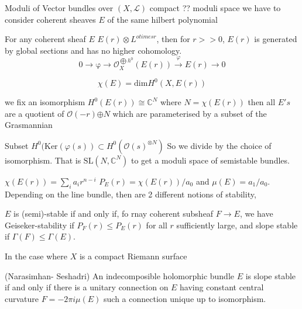 Moduli of Vector bundles over $ (X, \mathcal{L} ) $
compact ?? moduli space we have to consider coherent sheaves $E$ of the same hilbert polynomial 

For any coherent sheaf $E$  $E(r) \otimes L^{otimes r} $, 
then for $ r >> 0 $, $E(r) $ is generated by global sections and has no higher cohomology. 
\begin{equation}
    0 \rightarrow \mathrm{\varphi} \rightarrow \mathcal{O} _X ^{\bigoplus h^0} (E(r)) \xrightarrow{\varphi} E(r) \rightarrow 0 
\end{equation}

\begin{equation}
    \chi(E) = \mathrm{dim} H^0 (X, E(r)) 
\end{equation}

we fix an isomorphism $H^0 (E(r) ) \cong \mathbb{C} ^N $ where $ N = \chi(E(r))$
then all $ E's $ are a quotient of $ \mathcal{O} (-r) {\oplus N } $ which are parameterised by a subset of the Grasmannian 

Subset $ H ^0 ( \mathrm{Ker}(\varphi(s) ) \subset H^0 ( \mathcal{O} (s) ^{\otimes N} )$ 
So we divide by the choice of isomorphism. 
That is $ \mathrm{SL}(N, \mathbb{C}  ^N ) $ to get a moduli space of semistable bundles. 

$\chi ( E(r) ) = \sum _i a_i r^{n-i} $
$P_E (r) = \chi(E(r))/ a_0 $ and $\mu (E) = a_1/ a_0 $. 
Depending on the line bundle, then  are 2 different notions of stability,

$ E$ is (semi)-stable if and only if, fo rnay coherent subsheaf $ F \rightarrow  E$, 
we have Geiseker-stability if $P_F ( r) \leq P_E (r) $ for all $r$ sufficiently large, 
and slope stable if $ \Gamma(F) \leq \Gamma(E) $. 

In the case where $ X $ is a compact Riemann surface 
\begin{theorem}
    (Narasimhan- Seshadri) 
    An indecomposible holomorphic bundle $E$ is slope stable if and only if there is a unitary connection 
    on $E$ having constant central curvature $ F = -2 \pi i \mu (E) $ such a connection unique up to isomorphism. 
\end{theorem}





 

